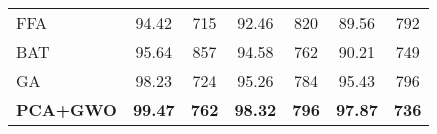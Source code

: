 \documentclass{llncs}
\begin{document}
\begin{table*}[tbp]
{\begin{tabular}{|l|c|c|c|c|c|c|}
FFA                                      & 94.42            & 715                                  & 92.46            & 820                                  & 89.56            & 792                                  \\ 
BAT                                      & 95.64             & 857                                 & 94.58            & 762                                  & 90.21            & 749                                  \\ 
GA                                      & 98.23             & 724                                  & 95.26            & 784                                  & 95.43            & 796                                  \\ 
\textbf{PCA+GWO}                         & \textbf{99.47}    & \textbf{762}                         & \textbf{98.32}    & \textbf{796}                       & \textbf{97.87}    & \textbf{736}                         \\ \hline
\end{tabular}
}
\mbox{}\\
\end{table*}
\end{document}
